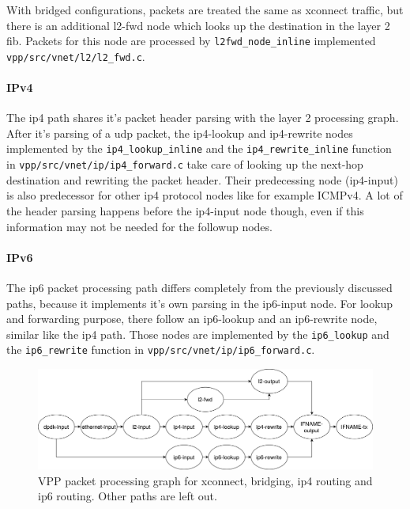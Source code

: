 With bridged configurations, packets are treated the same as xconnect
traffic, but there is an additional l2-fwd node which looks up the
destination in the layer 2 \Ac{fib}. Packets for this node are
processed by \lstinline|l2fwd_node_inline| implemented
\lstinline|vpp/src/vnet/l2/l2_fwd.c|.

\paragraph{IPv4}
\label{sec:headerparsing} 

The ip4 path shares it's packet header parsing with the layer 2
processing graph. After it's parsing of a \Ac{udp} packet, the
ip4-lookup and ip4-rewrite nodes implemented by the
\lstinline|ip4_lookup_inline| and the \lstinline|ip4_rewrite_inline|
function in \lstinline|vpp/src/vnet/ip/ip4_forward.c| take care of
looking up the next-hop destination and rewriting the packet header.
Their predecessing node (ip4-input) is also predecessor for other ip4
protocol nodes like for example ICMPv4. A lot of the header parsing
happens before the ip4-input node though, even if this information may
not be needed for the followup nodes.

\paragraph{IPv6}

The ip6 packet processing path differs completely from the previously
discussed paths, because it implements it's own parsing in the
ip6-input node. For lookup and forwarding purpose, there follow an
ip6-lookup and an ip6-rewrite node, similar like the ip4 path. Those
nodes are implemented by the \lstinline|ip6_lookup| and the
\lstinline|ip6_rewrite| function in
\lstinline|vpp/src/vnet/ip/ip6_forward.c|.

\begin{figure}[!ht]
\noindent\hspace{0.5mm}\includegraphics[width=\linewidth]{pics/vpp-nodes-horizontal.png}
\caption{VPP packet processing graph for xconnect, bridging, ip4 routing and ip6 routing. Other paths are left out. }
\label{nodegraph}
\end{figure}

